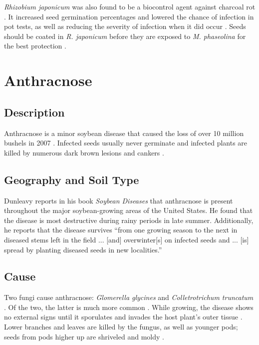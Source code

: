 \documentclass[letterpaper, 12pt]{report}
\begin{document}
\emph{Rhizobium japonicum} was also found to be a biocontrol agent against charcoal rot \autocite{al2012rhizobium}. It increased seed germination percentages and lowered the chance of infection in pot tests, as well as reducing the severity of infection when it did occur \autocite{al2012rhizobium}. Seeds should be coated in \emph{R. japonicum} before they are exposed to \emph{M. phaseolina} for the best protection \autocite{al2012rhizobium}.


\section{Anthracnose}

\subsection{Description}

Anthracnose is a minor soybean disease that caused the loss of over 10 million bushels in 2007 \autocite{wrather2009effects}. Infected seeds usually never germinate and infected plants are killed by numerous dark brown lesions and cankers \autocite{dunleavy1966soybean}.

\subsection{Geography and Soil Type}

Dunleavy reports in his book \emph{Soybean Diseases} that anthracnose is present throughout the major soybean-growing areas of the United States. He found that the disease is most destructive during rainy periods in late summer. Additionally, he reports that the disease survives ``from one growing season to the next in diseased stems left in the field ... [and] overwinter[s] on infected seeds and ... [is] spread by planting diseased seeds in new localities.''

\subsection{Cause}

Two fungi cause anthracnose: \emph{Glomerella glycines} and \emph{Colletrotrichum truncatum} \autocite{dunleavy1966soybean}. Of the two, the latter is much more common \autocite{dunleavy1966soybean}. While growing, the disease shows no external signs until it sporulates and invades the host plant's outer tissue \autocite{dunleavy1966soybean}. Lower branches and leaves are killed by the fungus, as well as younger pods; seeds from pods higher up are shriveled and moldy \autocite{dunleavy1966soybean}.
\end{document}
